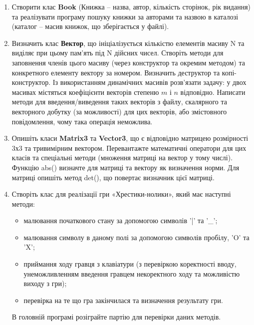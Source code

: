 \documentclass[a5paper,titlepage,openany,twoside,
]
{book_unv}%
\begin{document}
\begin{enumerate}
\begin{enumerate}
\begin{enumerate}
\item
  Створити клас \textbf{Book} (Книжка -- назва, автор, кількість сторінок, рік
  видання) та реалізувати програму пошуку книжки за авторами та назвою в
  каталозі (каталог -- масив книжок, що зберігається у файлі).
  
\item
  Визначить клас \textbf{Вектор}, що ініціалізується кількістю елементів масиву N
  та виділяє при цьому пам'ять під N дійсних чисел. Створіть методи для
  заповнення членів цього масиву (через конструктор та окремим методом)
  та конкретного елементу вектору за номером. Визначить деструктор та
  копі-конструктор. Із використанням динамічних масивів розв'язати
  задачу: у двох масивах містяться коефіцієнти векторів степеню $m$ і $n$
  відповідно. Написати методи для введення/виведення таких векторів з файлу,
  скалярного та векторного добутку (за можливості) для цих векторів, або
 змістовного повідомлення, чому така операція неможлива.
 
\item
  Опишіть класи \textbf{Matrix3} та \textbf{Vector3}, що є відповідно матрицею розмірності
  3х3 та тривимірним вектором. Перевантажте математичні оператори для
  цих класів та спеціальні методи (множення матриці на вектор у тому
  числі). Функцію abs() визначте для матриці та вектору як визначення
  норми. Для матриці опишіть метод det(), що повертає визначник цієї
  матриці.

\item
Створіть клас для реалізації гри «Хрестики-нолики», який має наступні методи: 
\begin{itemize}
\item
малювання початкового стану за допомогою символів '|' та '\_'; 
\item
малювання символу в даному полі за допомогою символів пробілу, 'O' та 'X'; 
\item
приймання ходу гравця з клавіатури (з перевіркою коректності вводу, 
унеможливленням введення гравцем некоректного ходу та можливістю виходу з гри);
\item
перевірка на те що гра закінчилася та визначення результату гри. 
\end{itemize}
В головній програмі розіграйте партію для перевірки даних методів.


\end{enumerate}
\end{enumerate}
\end{enumerate}
\end{document}
